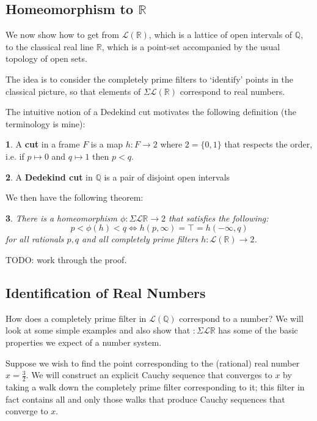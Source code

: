\documentclass[oneside,english]{amsbook}
\numberwithin{section}{chapter}
\theoremstyle{plain}
\newtheorem{thm}{\protect\theoremname}
\theoremstyle{definition}
\newtheorem{defn}[thm]{\protect\definitionname}
\providecommand{\definitionname}{Definition}
\providecommand{\theoremname}{Theorem}
\begin{document}
\subsection{Homeomorphism to $\mathbb{R}$}

We now show how to get from $\mathscr{L}(\mathbb{R})$, which is a lattice of open intervals of $\mathbb{Q}$, to the classical real line $\mathbb{R}$, which is a point-set accompanied by the usual topology of open sets. 

The idea is to consider the completely prime filters to `identify' points in the classical picture, so that elements of $\Sigma \mathscr{L}(\mathbb{R})$ correspond to real numbers.

The intuitive notion of a Dedekind cut motivates the following definition (the terminology is mine):

\begin{defn}
	A \textbf{cut} in a frame $F$ is a map $h:F\to 2$ where $2 = \{0, 1\}$ that respects the order, i.e. if $p\mapsto 0$ and $q\mapsto 1$ then $p<q$.
\end{defn}

\begin{defn}
	A \textbf{Dedekind cut} in $\mathbb{Q}$ is a pair of disjoint open intervals
\end{defn}

We then have the following theorem:

\begin{thm}
	There is a homeomorphism $\phi:\Sigma\mathscr{L}\mathbb{R}\to 2$ that satisfies the following: 
	\[
	p < \phi(h) < q \Leftrightarrow h(p, \infty) = \top = h(-\infty, q)
	\]	
	for all rationals $p, q$ and all completely prime filters $h:\mathscr{L}(\mathbb{R})\to 2$.
\end{thm}

TODO: work through the proof.

\subsection{Identification of Real Numbers}

How does a completely prime filter in $\mathscr{L}(\mathbb{Q})$ correspond to a number? We will look at some simple examples and also show that $:\Sigma\mathscr{L}\mathbb{R}$ has some of the basic properties we expect of a number system.

Suppose we wish to find the point corresponding to the (rational) real number $x=\frac{3}{2}$. We will construct an explicit Cauchy sequence that converges to $x$ by taking a walk down the completely prime filter corresponding to it; this filter in fact contains all and only those walks that produce Cauchy sequences that converge to $x$.
\end{document}

